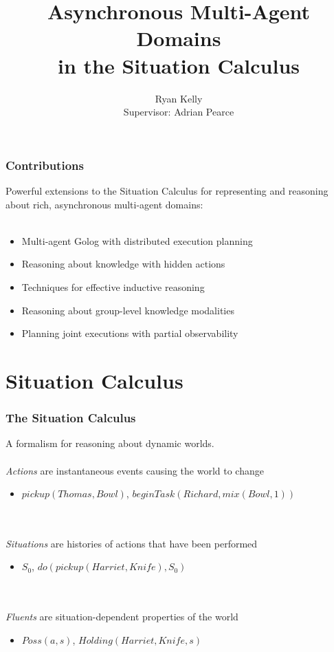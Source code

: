 \documentclass{beamer}
\title{Asynchronous Multi-Agent Domains\\ in the Situation Calculus}
\author[Ryan Kelly]{Ryan Kelly\\ Supervisor: Adrian Pearce}
\begin{document}
\begin{frame}
  \titlepage
\end{frame}

\begin{frame}
  \frametitle{Contributions}
  Powerful extensions to the Situation Calculus for representing and reasoning
  about rich, asynchronous multi-agent domains:
  \ \\
  \ \\
  \begin{itemize}
  \item Multi-agent Golog with distributed execution planning
  \item Reasoning about knowledge with hidden actions
  \item Techniques for effective inductive reasoning
  \item Reasoning about group-level knowledge modalities
  \item Planning joint executions with partial observability
  \end{itemize}
\end{frame}

\section{Situation Calculus}

\begin{frame}
\frametitle{The Situation Calculus}
A formalism for reasoning about dynamic worlds.
\ \\
\ \\
\emph{Actions} are instantaneous events causing the world to change
\begin{itemize}
  \item $pickup(Thomas,Bowl)$, $beginTask(Richard,mix(Bowl,1))$
\end{itemize}
\ \\
\ \\
\emph{Situations} are histories of actions that have been performed
\begin{itemize}
  \item $S_0$, $do(pickup(Harriet,Knife),S_0)$
\end{itemize}
\ \\
\ \\
\emph{Fluents} are situation-dependent properties of the world
\begin{itemize}
  \item $Poss(a,s)$, $Holding(Harriet,Knife,s)$
\end{itemize}
\end{frame}
\end{document}
